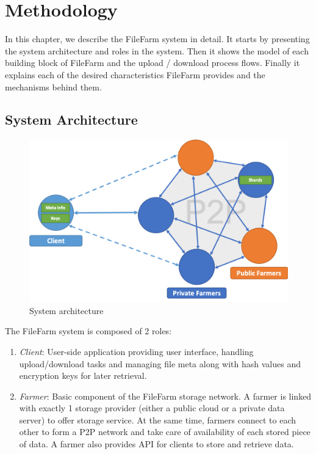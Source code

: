 \chapter{Methodology}
\label{c:methodology}

In this chapter, we describe the FileFarm system in detail. It starts by presenting the system architecture and roles in the system. Then it shows the model of each building block of FileFarm and the upload / download process flows. Finally it explains each of the desired characteristics FileFarm provides and the mechanisms behind them.

\section{System Architecture}
\label{s:systemarchitecture}

\begin{figure}[hbt]
\centering
  \includegraphics[width=15cm]{figures/system_architecture.png}
  \caption{System architecture}
  \label{fig:systemarchitecture}
\end{figure}

\noindent The FileFarm system is composed of 2 roles:

\begin{enumerate}
  \item \textit{Client}: User-side application providing user interface, handling upload/download tasks and managing file meta along with hash values and encryption keys for later retrieval.
  \item \textit{Farmer}: Basic component of the FileFarm storage network. A farmer is linked with exactly 1 storage provider (either a public cloud or a private data server) to offer storage service. At the same time, farmers connect to each other to form a P2P network and take care of availability of each stored piece of data. A farmer also provides API for clients to store and retrieve data.
\end{enumerate}

